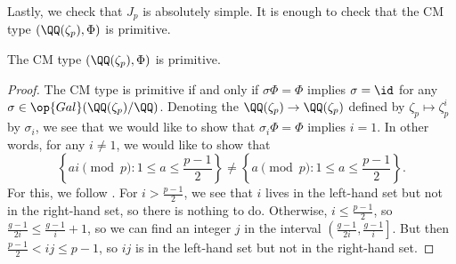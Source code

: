 \documentclass{article}
\begin{document}
Lastly, we check that $J_p$ is absolutely simple. It is enough to check that the CM type $(\QQ(\zeta_p),\Phi)$ is primitive.
\begin{lemma}
	The CM type $(\QQ(\zeta_p),\Phi)$ is primitive.
\end{lemma}
\begin{proof}
	The CM type is primitive if and only if $\sigma\Phi=\Phi$ implies $\sigma=\id$ for any $\sigma\in\op{Gal}(\QQ(\zeta_p)/\QQ)$. Denoting the $\QQ(\zeta_p)\to\QQ(\zeta_p)$ defined by $\zeta_p\mapsto\zeta_p^i$ by $\sigma_i$, we see that we would like to show that $\sigma_i\Phi=\Phi$ implies $i=1$. In other words, for any $i\ne1$, we would like to show that
	\[\left\{ai\pmod p:1\le a\le\frac{p-1}2\right\}\ne\left\{a\pmod p:1\le a\le\frac{p-1}2\right\}.\]
	For this, we follow \cite[Lemma~4.2]{goodson-fermat-av-degeneracy}. For $i>\frac{p-1}2$, we see that $i$ lives in the left-hand set but not in the right-hand set, so there is nothing to do. Otherwise, $i\le\frac{p-1}2$, so $\frac{g-1}{2i}\le\frac{g-1}i+1$, so we can find an integer $j$ in the interval $\left(\frac{g-1}{2i},\frac{g-1}i\right]$. But then $\frac{p-1}2<ij\le p-1$, so $ij$ is in the left-hand set but not in the right-hand set.
\end{proof}

\end{document}
